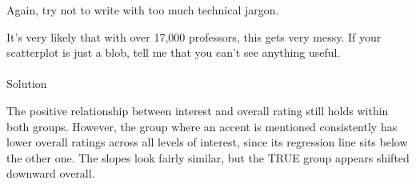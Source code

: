 \documentclass[
  letterpaper,
  DIV=11,
  numbers=noendperiod]{scrartcl}
\makeatletter
\let\oldparagraph\paragraph
\renewcommand{\paragraph}{
    \@ifstar
      \xxxParagraphStar
      \xxxParagraphNoStar
  }
\newcommand{\xxxParagraphStar}[1]{\oldparagraph*{#1}\mbox{}}
\newcommand{\xxxParagraphNoStar}[1]{\oldparagraph{#1}\mbox{}}
\makeatother
\begin{document}
Again, try not to write with too much technical jargon.

It's very likely that with over 17,000 professors, this gets very messy.
If your scatterplot is just a blob, tell me that you can't see anything
useful.

\paragraph{Solution}\label{solution-14}

The positive relationship between interest and overall rating still
holds within both groups. However, the group where an accent is
mentioned consistently has lower overall ratings across all levels of
interest, since its regression line sits below the other one. The slopes
look fairly similar, but the TRUE group appears shifted downward
overall.
\end{document}
